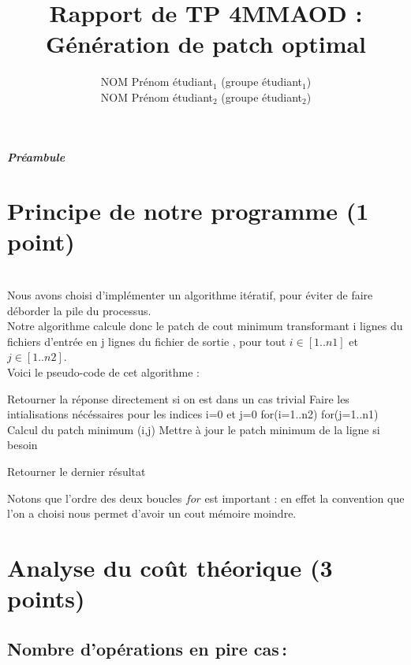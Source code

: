 \documentclass[a4paper, 10pt, french]{article}
\title{Rapport de TP 4MMAOD : Génération de patch optimal}
\author{
NOM Prénom étudiant$_1$ (groupe étudiant$_1$) 
\\ NOM Prénom étudiant$_2$ (groupe étudiant$_2$) 
}
\begin{document}
\maketitle

\paragraph{\em Préambule}

\section{Principe de notre  programme (1 point)}
~\\Nous avons choisi d'implémenter un algorithme itératif, pour éviter de faire déborder la pile du processus. \\
Notre algorithme calcule donc le patch de cout minimum transformant i lignes du fichiers d'entrée en j lignes
du fichier de sortie , pour tout $i \in [1..n1]$ et $j \in [1..n2]$. \\
Voici le pseudo-code de cet algorithme :
\begin{verbatimtab}
	Retourner la réponse directement si on est dans un cas trivial
	Faire les intialisations nécéssaires pour les indices i=0 et j=0
	for(i=1..n2)
	  for(j=1..n1)
		Calcul du patch minimum (i,j)
		Mettre à jour le patch minimum de la ligne si besoin
	
	Retourner le dernier résultat
\end{verbatimtab}

Notons que l'ordre des deux boucles $for$ est important : en effet la convention que l'on a choisi 
nous permet d'avoir un cout mémoire moindre.
\section{Analyse du coût théorique (3 points)}

  \subsection{Nombre  d'opérations en pire cas\,: }
\end{document}
